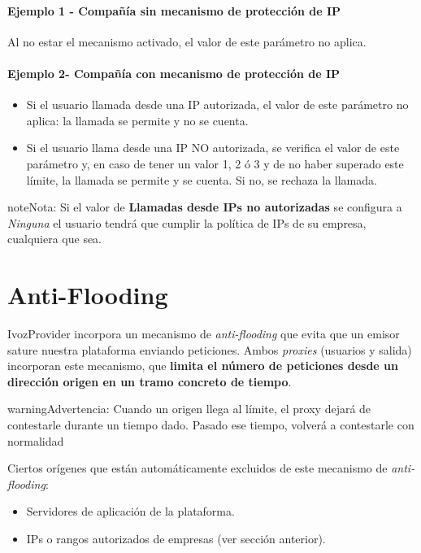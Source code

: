 \documentclass[letterpaper,10pt,spanish]{sphinxmanual}
\begin{document}
\paragraph{Ejemplo 1 - Compañía sin mecanismo de protección de IP}

Al no estar el mecanismo activado, el valor de este parámetro no aplica.
\paragraph{Ejemplo 2- Compañía con mecanismo de protección de IP}
\begin{itemize}
\item {} 
Si el usuario llamada desde una IP autorizada, el valor de este parámetro no aplica: la llamada se permite y no se cuenta.

\item {} 
Si el usuario llama desde una IP NO autorizada, se verifica el valor de este parámetro y, en caso de tener un valor 1, 2 ó 3 y de no haber superado este límite, la llamada se permite y se cuenta. Si no, se rechaza la llamada.

\end{itemize}

\begin{notice}{note}{Nota:}
Si el valor de \textbf{Llamadas desde IPs no autorizadas} se configura a \emph{Ninguna} el usuario tendrá que cumplir la política de IPs de su empresa, cualquiera que sea.
\end{notice}


\section{Anti-Flooding}
\label{security/index:anti-flooding}
IvozProvider incorpora un mecanismo de \emph{anti-flooding} que evita que un emisor sature nuestra plataforma enviando peticiones. Ambos \emph{proxies} (usuarios y salida) incorporan este mecanismo, que \textbf{limita el número de peticiones desde un dirección origen en un tramo concreto de tiempo}.

\begin{notice}{warning}{Advertencia:}
Cuando un origen llega al límite, el proxy dejará de contestarle durante un tiempo dado. Pasado ese tiempo, volverá a contestarle con normalidad
\end{notice}

Ciertos orígenes que están automáticamente excluidos de este mecanismo de \emph{anti-flooding}:
\begin{itemize}
\item {} 
Servidores de aplicación de la plataforma.

\item {} 
IPs o rangos autorizados de empresas (ver sección anterior).

\end{itemize}
\end{document}
